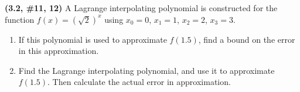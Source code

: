 \documentclass{eh-homework}
\begin{document}
    \begin{question}{6}
    \textbf{(3.2, \#11, 12)} A Lagrange interpolating polynomial is constructed for the function \(f(x) = (\sqrt{2})^x\) using \(x_0 = 0\), \(x_1 = 1\), \(x_2 = 2\), \(x_3 = 3\).
    
    \begin{enumerate}[label=\alph*.]
        \item If this polynomial is used to approximate \(f(1.5)\), find a bound on the error in this approximation.
    
        \item Find the Lagrange interpolating polynomial, and use it to approximate \(f(1.5)\). Then calculate the actual error in approximation.
    \end{enumerate}
    \end{question}
\end{document}
